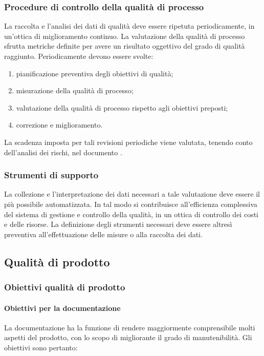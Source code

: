 \documentclass[12pt,a4paper]{article}
\begin{document}
	\subsubsection{Procedure di controllo della qualità di processo}
	La raccolta e l'analisi dei dati di qualità deve essere ripetuta periodicamente, in un'ottica di miglioramento continuo. La valutazione della qualità di processo sfrutta metriche  definite per avere un risultato oggettivo del grado di qualità raggiunto. Periodicamente devono essere svolte:
	\begin{enumerate}
		\item pianificazione preventiva degli obiettivi di qualità;
		\item misurazione della qualità di processo;
		\item valutazione della qualità di processo rispetto agli obiettivi preposti;
		\item correzione e miglioramento.
	\end{enumerate}
	La scadenza imposta per tali revisioni periodiche viene valutata, tenendo  conto dell'analisi dei rischi, nel documento \PdP{}.
	
	\subsubsection{Strumenti di supporto}
	La collezione e l'interpretazione dei dati necessari a tale valutazione deve essere il più possibile automatizzata. In tal modo si contribuisce all'efficienza complessiva del sistema di gestione e controllo della qualità, in un ottica di controllo dei costi e delle risorse. La definizione degli strumenti necessari deve essere altresì preventiva all'effettuazione delle misure o alla raccolta dei dati.
	
	\subsection{Qualità di prodotto}
	
	\subsubsection{Obiettivi qualità di prodotto}
	
	\paragraph{Obiettivi per la documentazione}
	La documentazione ha la funzione di rendere maggiormente comprensibile molti aspetti del prodotto, con lo scopo di migliorante il grado di manutenibilità. Gli obiettivi sono pertanto:
	
\end{document}
